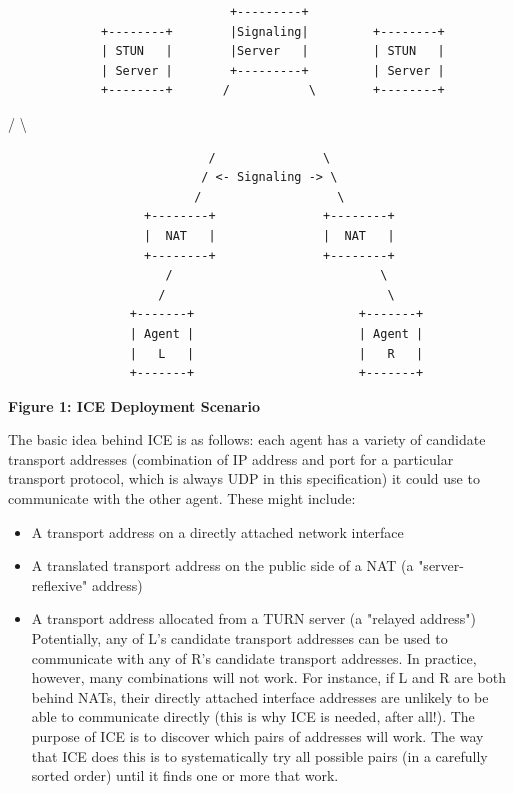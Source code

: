 \documentclass{article}
\begin{document}
\begin{verbatim}
                               +---------+
             +--------+        |Signaling|         +--------+
             | STUN   |        |Server   |         | STUN   |
             | Server |        +---------+         | Server |
             +--------+       /           \        +--------+
\end{verbatim}

/             \textbackslash{}

\begin{verbatim}
                            /               \
                           / <- Signaling -> \
                          /                   \
                   +--------+               +--------+
                   |  NAT   |               |  NAT   |
                   +--------+               +--------+
                      /                             \
                     /                               \
                 +-------+                       +-------+
                 | Agent |                       | Agent |
                 |   L   |                       |   R   |
                 +-------+                       +-------+

\end{verbatim}

\begin{center}
\textbf{Figure 1: ICE Deployment Scenario}
\end{center}

The basic idea behind ICE is as follows: each agent has a variety of candidate transport addresses (combination of IP address and port for a particular transport protocol, which is always UDP in this specification) it could use to communicate with the other agent. These might include:

\begin{itemize}
\item A transport address on a directly attached network interface
\item A translated transport address on the public side of a NAT (a "server-reflexive" address)
\item A transport address allocated from a TURN server (a "relayed address")
Potentially, any of L's candidate transport addresses can be used to communicate with any of R's candidate transport addresses.  In practice, however, many combinations will not work.  For instance, if L and R are both behind NATs, their directly attached interface addresses are unlikely to be able to communicate directly (this is why ICE is needed, after all!).  The purpose of ICE is to discover which pairs of addresses will work.  The way that ICE does this is to systematically try all possible pairs (in a carefully sorted order) until it finds one or more that work.

\end{itemize}
\end{document}
